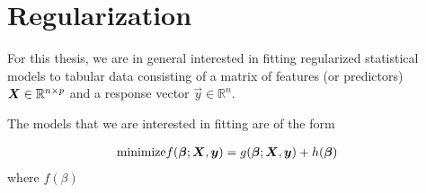 \documentclass{book}
\begin{document}
%
%

\section{Regularization}

For this thesis, we are in general interested in fitting regularized statistical models to tabular data consisting of a matrix of features (or predictors) \(\boldsymbol{X} \in \mathbb{R}^{n \times p}\) and a response vector \(\vec{y} \in \mathbb{R}^n\).

The models that we are interested in fitting are of the form

\begin{align*}
  \text{minimize} & f(\boldsymbol{\beta}; \boldsymbol{X}, \boldsymbol{y}) = g(\boldsymbol{\beta}; \boldsymbol{X}, \boldsymbol{y}) + h(\boldsymbol{\beta})
\end{align*}
where \(f(\beta)\)
\end{document}
